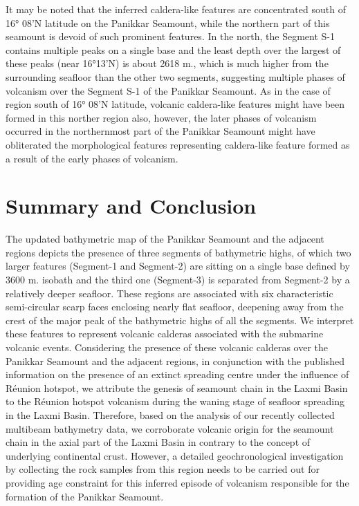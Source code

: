 \documentclass[twocolumn]{article}
\begin{document}
It may be noted that the inferred caldera-like features are concentrated south of 16° 08’N latitude on the Panikkar Seamount, while the northern part of this seamount is devoid of such prominent features. In the north, the Segment S-1 contains multiple peaks on a single base and the least depth over the largest of these peaks (near 16°13'N) is about 2618 m., which is much higher from the surrounding seafloor than the other two segments, suggesting multiple phases of volcanism over the Segment S-1 of the Panikkar Seamount. As in the case of region south of 16° 08’N latitude, volcanic caldera-like features might have been formed in this norther region also, however, the later phases of volcanism occurred in the northernmost part of the Panikkar Seamount might have obliterated the morphological features representing caldera-like feature formed as a result of the early phases of volcanism.   

\section{Summary and Conclusion}

The updated bathymetric map of the Panikkar Seamount and the adjacent regions depicts the presence of three segments of bathymetric highs, of which two larger features (Segment-1 and Segment-2) are sitting on a single base defined by 3600 m. isobath and the third one (Segment-3) is separated from Segment-2 by a relatively deeper seafloor. These regions are associated with six characteristic semi-circular scarp faces enclosing nearly flat seafloor, deepening away from the crest of the major peak of the bathymetric highs of all the segments. We interpret these features to represent volcanic calderas associated with the submarine volcanic events. Considering the presence of these volcanic calderas over the Panikkar Seamount and the adjacent regions, in conjunction with the published information on the presence of an extinct spreading centre under the influence of R\'eunion hotspot, we attribute the genesis of seamount chain in the Laxmi Basin to the R\'eunion hotspot volcanism during the waning stage of seafloor spreading in the Laxmi Basin. Therefore, based on the analysis of our recently collected multibeam bathymetry data, we corroborate volcanic origin for the seamount chain in the axial part of the Laxmi Basin in contrary to the concept of underlying continental crust. However, a detailed geochronological investigation by collecting the rock samples from this region needs to be carried out for providing age constraint for this inferred episode of volcanism responsible for the formation of the Panikkar Seamount.
\end{document}
